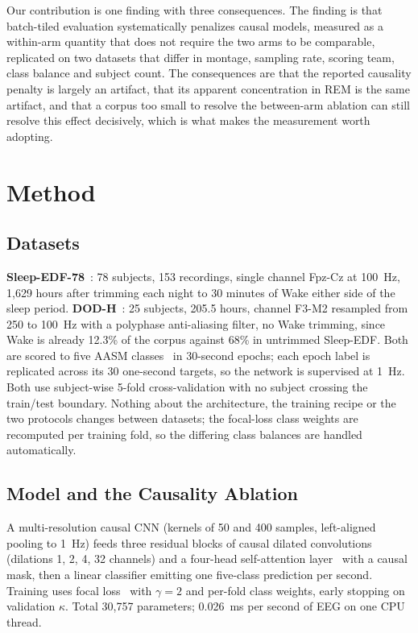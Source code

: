 \documentclass[conference]{IEEEtran}
\begin{document}
Our contribution is one finding with three consequences. The finding is that batch-tiled
evaluation systematically penalizes causal models, measured as a within-arm quantity that does
not require the two arms to be comparable, replicated on two datasets that differ in montage,
sampling rate, scoring team, class balance and subject count. The consequences are that the
reported causality penalty is largely an artifact, that its apparent concentration in REM is the
same artifact, and that a corpus too small to resolve the between-arm ablation can still resolve
this effect decisively, which is what makes the measurement worth adopting.

\section{Method}

\subsection{Datasets}

\textbf{Sleep-EDF-78}~\cite{physionet,kemp}: 78 subjects, 153 recordings, single channel Fpz-Cz
at 100~Hz, 1{,}629 hours after trimming each night to 30 minutes of Wake either side of the sleep
period. \textbf{DOD-H}~\cite{dod}: 25 subjects, 205.5 hours, channel F3-M2 resampled from 250 to
100~Hz with a polyphase anti-aliasing filter, no Wake trimming, since Wake is already 12.3\% of
the corpus against 68\% in untrimmed Sleep-EDF. Both are scored to five AASM classes~\cite{aasm}
in 30-second epochs; each epoch label is replicated across its 30 one-second targets, so the
network is supervised at 1~Hz. Both use subject-wise 5-fold cross-validation with no subject
crossing the train/test boundary. Nothing about the architecture, the training recipe or the two
protocols changes between datasets; the focal-loss class weights are recomputed per training
fold, so the differing class balances are handled automatically.

\subsection{Model and the Causality Ablation}

A multi-resolution causal CNN (kernels of 50 and 400 samples, left-aligned pooling to 1~Hz) feeds
three residual blocks of causal dilated convolutions~\cite{tcn} (dilations 1, 2, 4, 32 channels)
and a four-head self-attention layer~\cite{attention} with a causal mask, then a linear classifier
emitting one five-class prediction per second. Training uses focal loss~\cite{focal} with
$\gamma = 2$ and per-fold class weights, early stopping on validation $\kappa$. Total 30{,}757
parameters; 0.026~ms per second of EEG on one CPU thread.
\end{document}
